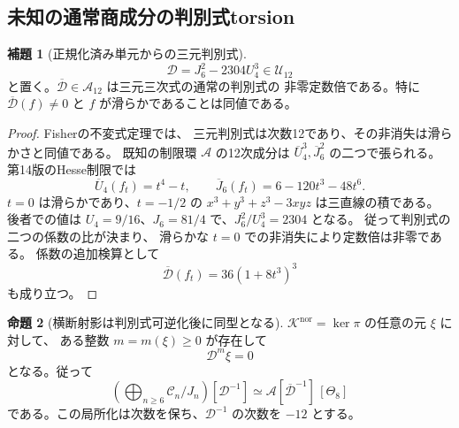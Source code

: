 \documentclass[a4paper,11pt]{ltjsarticle}
\newcommand{\mathscr}{\mathcal}
\theoremstyle{definition}
\newtheorem{theorem}{命題}[section]
\newtheorem{lemma}[theorem]{補題}
\begin{document}
\subsection{未知の通常商成分の判別式torsion}

\begin{lemma}[正規化済み単元からの三元判別式]
\label{lem:v17-unit-discriminant}
\[
 \mathscr D=J_6^2-2304U_4^3\in\mathcal U_{12}
\]
と置く。$\overline{\mathscr D}\in\mathcal A_{12}$ は三元三次式の通常の判別式の
非零定数倍である。特に $\overline{\mathscr D}(f)\ne0$ と
$f$ が滑らかであることは同値である。
\end{lemma}

\begin{proof}
Fisherの不変式定理\cite[Theorem~4.4]{Fisher2008}では、
三元判別式は次数12であり、その非消失は滑らかさと同値である。
既知の制限環 $\mathcal A$ の12次成分は
$\overline U_4^3,\overline J_6^2$ の二つで張られる。
第14版のHesse制限では
\[
 \overline U_4(f_t)=t^4-t,\qquad
 \overline J_6(f_t)=6-120t^3-48t^6.
\]
$t=0$ は滑らかであり、$t=-1/2$ の
$x^3+y^3+z^3-3xyz$ は三直線の積である。
後者での値は $U_4=9/16$、$J_6=81/4$ で、$J_6^2/U_4^3=2304$ となる。
従って判別式の二つの係数の比が決まり、
滑らかな $t=0$ での非消失により定数倍は非零である。
係数の追加検算として
\[
 \overline{\mathscr D}(f_t)=36(1+8t^3)^3
\]
も成り立つ。
\end{proof}

\begin{theorem}[横断射影は判別式可逆化後に同型となる]
\label{thm:v17-normal-kernel-discriminant-torsion}
$\mathcal K^{\mathrm{nor}}=\ker\pi$ の任意の元 $\xi$ に対して、
ある整数 $m=m(\xi)\ge0$ が存在して
\begin{equation}\label{eq:v17-normal-kernel-discriminant-torsion}
 \mathscr D^m\xi=0
\end{equation}
となる。従って
\begin{equation}\label{eq:v17-discriminant-localized-quotient}
 \left(\bigoplus_{n\ge6}\mathcal C_n/J_n\right)[\mathscr D^{-1}]
 \simeq
 \mathcal A[\overline{\mathscr D}^{-1}]\,[\Theta_8]
\end{equation}
である。この局所化は次数を保ち、$\mathscr D^{-1}$ の次数を $-12$ とする。
\end{theorem}
\end{document}
